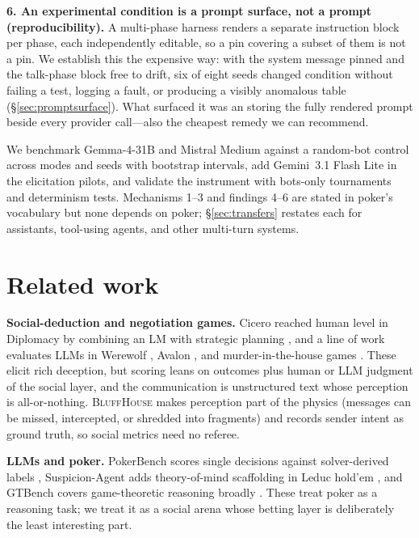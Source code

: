 \documentclass{article}
\begin{document}
\textbf{6. An experimental condition is a prompt surface, not a prompt
(reproducibility).} A multi-phase harness renders a separate instruction block
per phase, each independently editable, so a pin covering a subset of them
is not a pin. We establish this the expensive way: with the system
message pinned and the talk-phase block free to drift, six of eight seeds
changed condition without failing a test, logging a fault, or producing a
visibly anomalous table (\S\ref{sec:promptsurface}). What surfaced it was an
storing the fully rendered prompt beside every provider call---also the
cheapest remedy we can recommend.

We benchmark Gemma-4-31B and Mistral Medium against a random-bot control
across modes and seeds with bootstrap intervals, add Gemini~3.1 Flash Lite in
the elicitation pilots, and validate the instrument with bots-only
tournaments and determinism tests. Mechanisms 1--3 and findings 4--6 are
stated in poker's vocabulary but none depends on poker;
\S\ref{sec:transfers} restates each for assistants, tool-using agents, and
other multi-turn systems.

\section{Related work}
\label{sec:related}

\textbf{Social-deduction and negotiation games.} Cicero reached human level
in Diplomacy by combining an LM with strategic planning
\citep{bakhtin2022cicero}, and a line of work evaluates LLMs in Werewolf
\citep{xu2023werewolf}, Avalon \citep{light2023avalonbench}, and
murder-in-the-house games \citep{ogara2023hoodwinked}. These elicit rich
deception, but scoring leans on outcomes plus human or LLM judgment of the
social layer, and the communication is unstructured text whose perception
is all-or-nothing. \textsc{BluffHouse} makes perception part of the physics
(messages can be missed, intercepted, or shredded into fragments) and
records sender intent as ground truth, so social metrics need no referee.

\textbf{LLMs and poker.} PokerBench scores single decisions against
solver-derived labels \citep{zhuang2025pokerbench}, Suspicion-Agent adds
theory-of-mind scaffolding in Leduc hold'em \citep{guo2023suspicion}, and
GTBench covers game-theoretic reasoning broadly \citep{duan2024gtbench}.
These treat poker as a reasoning task; we treat it as a social arena whose
betting layer is deliberately the least interesting part.
\end{document}
